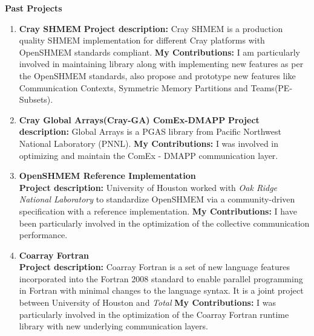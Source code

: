 \textbf{Past Projects}
\begin{enumerate}
\setcounter{enumi}{0}
\item \textbf{Cray SHMEM}
    \textbf{Project description:} Cray SHMEM is a production quality SHMEM
    implementation for different Cray platforms with OpenSHMEM standards
    compliant. \textbf{My Contributions:} I am particularly involved in
    maintaining library along with implementing new features as per the
    OpenSHMEM standards, also propose and prototype new features like
    Communication Contexts, Symmetric Memory Partitions and Teams(PE-Subsets).

\item \textbf{Cray Global Arrays(Cray-GA) ComEx-DMAPP}
    \textbf{Project description:} Global Arrays is a PGAS library from Pacific
    Northwest National Laboratory (PNNL). \textbf{My Contributions:} I was
    involved in optimizing and maintain the ComEx - DMAPP communication layer.

\item \textbf{OpenSHMEM Reference Implementation}\\
    \textbf{Project description:} University of Houston worked with \textit{Oak
    Ridge National Laboratory} to standardize OpenSHMEM via a community-driven
    specification with a reference implementation. \textbf{My Contributions:}
    I have been particularly involved in the optimization of the collective
    communication performance.

\item \textbf{Coarray Fortran}\\
    \textbf{Project description:} Coarray Fortran is a set of new language
    features incorporated into the Fortran 2008 standard to enable parallel
    programming in Fortran with minimal changes to the language syntax. It is a
    joint project between University of Houston and \textit{Total}
    \textbf{My Contributions:} I was particularly involved in the optimization
    of the Coarray Fortran runtime library with new underlying communication
    layers.
\end{enumerate}
